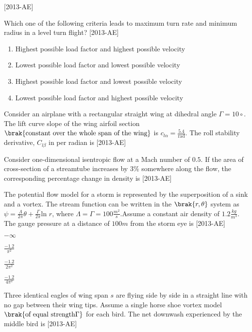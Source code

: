     \hfill{[2013-AE]}
\item Which one of the following criteria leads to maximum turn rate and minimum radius in a level turn flight? \hfill{[2013-AE]}
\begin{enumerate}
    \item Highest possible load factor and highest possible velocity
    \item Lowest possible load factor and lowest possible velocity
    \item Highest possible load factor and lowest possible velocity
    \item Lowest possible load factor and highest possible velocity
\end{enumerate}
\item Consider an airplane with a rectangular straight wing at dihedral angle $\Gamma = 10{\circ}$. The lift curve slope of the wing airfoil section $\brak{\text{constant over the whole span of the wing}}$ is $c_{l \alpha} = \frac{5.4}{\text{rad}}$. The roll stability derivative, $C_{l \beta}$ in per radian is \underline{\hspace{1cm}} \hfill{[2013-AE]}\\
\item Consider one-dimensional isentropic flow at a Mach number of $0.5$. If the area of cross-section of a streamtube increases by $3\%$ somewhere along the flow, the corresponding percentage change in density is \underline{\hspace{1cm}} \hfill{[2013-AE]}\\
\item The potential flow model for a storm is represented by the superposition of a sink and a vortex. The stream function can be written in the $\brak{r,\theta}$ system as $\psi=\frac{\Lambda}{2\pi}\theta+\frac{\Gamma}{2\pi} \text{ln } r$, where $\Lambda=\Gamma=100 \frac{m^2}{s}$.Assume a constant air density of $1.2 \frac{kg}{m^3}$. The gauge pressure at a distance of $100 m$ from the storm eye is \hfill{[2013-AE]}
\begin{enumerate}
\begin{multicols}{4}
\item $-\infty$
\item $\frac{-1.2}{\pi ^2}$
\item $\frac{-1.2}{2\pi ^2}$
\item $\frac{-1.2}{4\pi ^2}$
\end{multicols}
\end{enumerate}
\item Three identical eagles of wing span $s$ are flying side by side in a straight line with no gap between their wing tips. Assume a single horse shoe vortex model $\brak{\text{of equal strength}\Gamma}$ for each bird. The net downwash experienced by the middle bird is \hfill{[2013-AE]}
